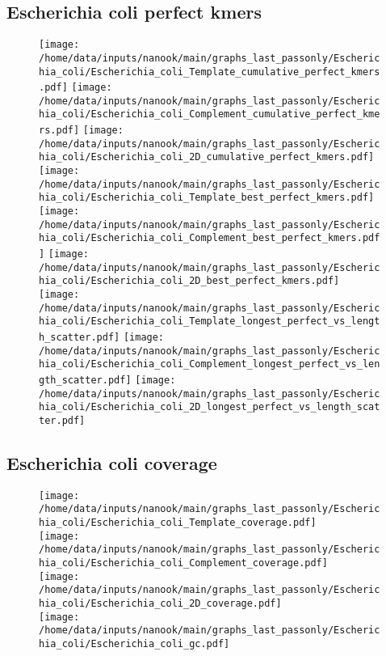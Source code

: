 \documentclass[a4paper,11pt,oneside]{article}
\begin{document}
\subsection*{Escherichia coli perfect kmers}
\vspace{-3mm}
\begin{figure}[H]
\centering
\texttt{[image: /home/data/inputs/nanook/main/graphs\_last\_passonly/Escherichia\_coli/Escherichia\_coli\_Template\_cumulative\_perfect\_kmers.pdf]}
\texttt{[image: /home/data/inputs/nanook/main/graphs\_last\_passonly/Escherichia\_coli/Escherichia\_coli\_Complement\_cumulative\_perfect\_kmers.pdf]}
\texttt{[image: /home/data/inputs/nanook/main/graphs\_last\_passonly/Escherichia\_coli/Escherichia\_coli\_2D\_cumulative\_perfect\_kmers.pdf]}
\texttt{[image: /home/data/inputs/nanook/main/graphs\_last\_passonly/Escherichia\_coli/Escherichia\_coli\_Template\_best\_perfect\_kmers.pdf]}
\texttt{[image: /home/data/inputs/nanook/main/graphs\_last\_passonly/Escherichia\_coli/Escherichia\_coli\_Complement\_best\_perfect\_kmers.pdf]}
\texttt{[image: /home/data/inputs/nanook/main/graphs\_last\_passonly/Escherichia\_coli/Escherichia\_coli\_2D\_best\_perfect\_kmers.pdf]}
\texttt{[image: /home/data/inputs/nanook/main/graphs\_last\_passonly/Escherichia\_coli/Escherichia\_coli\_Template\_longest\_perfect\_vs\_length\_scatter.pdf]}
\texttt{[image: /home/data/inputs/nanook/main/graphs\_last\_passonly/Escherichia\_coli/Escherichia\_coli\_Complement\_longest\_perfect\_vs\_length\_scatter.pdf]}
\texttt{[image: /home/data/inputs/nanook/main/graphs\_last\_passonly/Escherichia\_coli/Escherichia\_coli\_2D\_longest\_perfect\_vs\_length\_scatter.pdf]}
\end{figure}
\subsection*{Escherichia coli coverage}
\vspace{-3mm}
\begin{figure}[H]
\centering
\texttt{[image: /home/data/inputs/nanook/main/graphs\_last\_passonly/Escherichia\_coli/Escherichia\_coli\_Template\_coverage.pdf]} \\
\texttt{[image: /home/data/inputs/nanook/main/graphs\_last\_passonly/Escherichia\_coli/Escherichia\_coli\_Complement\_coverage.pdf]} \\
\texttt{[image: /home/data/inputs/nanook/main/graphs\_last\_passonly/Escherichia\_coli/Escherichia\_coli\_2D\_coverage.pdf]} \\
\texttt{[image: /home/data/inputs/nanook/main/graphs\_last\_passonly/Escherichia\_coli/Escherichia\_coli\_gc.pdf]}
\end{figure}
\end{document}
